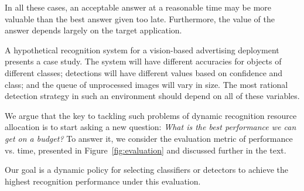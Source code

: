 In all these cases, an acceptable answer at a reasonable time may be more valuable than the best answer given too late.
Furthermore, the value of the answer depends largely on the target application.

A hypothetical recognition system for a vision-based advertising deployment presents a case study.
The system will have different accuracies for objects of different classes; detections will have different values based on confidence and class; and the queue of unprocessed images will vary in size.
The most rational detection strategy in such an environment should depend on all of these variables.

We argue that the key to tackling such problems of dynamic recognition resource allocation is to start asking a new question:
\emph{What is the best performance we can get on a budget?}
To answer it, we consider the evaluation metric of performance vs. time, presented in Figure~\ref{fig:evaluation} and discussed further in the text.

Our goal is a dynamic policy for selecting classifiers or detectors to achieve the highest recognition performance under this evaluation.
